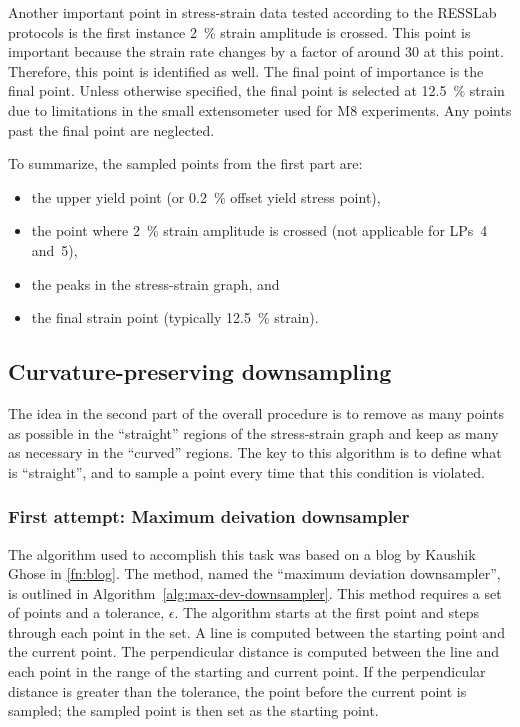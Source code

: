 \documentclass[a4paper,11pt]{article}
\begin{document}
Another important point in stress-strain data tested according to the RESSLab protocols is the first instance 2~\% strain amplitude is crossed.
This point is important because the strain rate changes by a factor of around 30 at this point.
Therefore, this point is identified as well.
The final point of importance is the final point.
Unless otherwise specified, the final point is selected at 12.5~\% strain due to limitations in the small extensometer used for M8 experiments.
Any points past the final point are neglected.

To summarize, the sampled points from the first part are:
\begin{itemize}
    \item the upper yield point (or 0.2~\% offset yield stress point),
    \item the point where 2~\% strain amplitude is crossed (not applicable for LPs~4 and~5),
    \item the peaks in the stress-strain graph, and
    \item the final strain point (typically 12.5~\% strain).
\end{itemize}

\subsection{Curvature-preserving downsampling}

The idea in the second part of the overall procedure is to remove as many points as possible in the ``straight'' regions of the stress-strain graph and keep as many as necessary in the ``curved'' regions.
The key to this algorithm is to define what is ``straight'', and to sample a point every time that this condition is violated.

\subsubsection{First attempt: Maximum deivation downsampler}

The algorithm used to accomplish this task was based on a blog by Kaushik Ghose in \cref{fn:blog}.
The method, named the ``maximum deviation downsampler'', is outlined in Algorithm~\ref{alg:max-dev-downsampler}.
This method requires a set of points and a tolerance, $\epsilon$.
The algorithm starts at the first point and steps through each point in the set.
A line is computed between the starting point and the current point.
The perpendicular distance is computed between the line and each point in the range of the starting and current point.
If the perpendicular distance is greater than the tolerance, the point before the current point is sampled; the sampled point is then set as the starting point.
\end{document}
